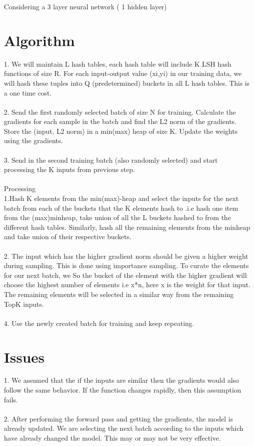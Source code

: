 \documentclass[letterpaper,10pt]{article}
\begin{document}
Considering a 3 layer neural network ( 1 hidden layer)
\section{Algorithm}
1. We will maintain L hash tables, each hash table will include K LSH hash functions of size R. For each input-output value (xi,yi) in our training data, we will hash these tuples into Q (predetermined) buckets in all L hash tables. This is a one time cost.\\
\\
2. Send the first randomly selected batch of size N for training. Calculate the gradients for each sample in the batch and find the L2 norm of the gradients. Store the (input, L2 norm) in a min(max) heap of size K. Update the weights using the gradients.\\
\\
3. Send in the second training batch (also randomly selected) and start processing the K inputs from previous step.
\\
\\
Processing\\
1.Hash K elements from the min(max)-heap and select the inputs for the next batch from each of the buckets that the K elements hash to .i.e hash one item from the (max)minheap, take union of all the L buckets hashed to from the different hash tables. Similarly, hash all the remaining elements from the minheap and take union of their respective buckets. \\
\\
2. The input which has the higher gradient norm should be given a higher weight during sampling. This is done using importance sampling. To curate the elements for our next batch, we  So the bucket of the element with the higher gradient will choose the highest number of elements i.e x*n, here x is the weight for that input. The remaining elements will be selected in a similar way from the remaining TopK inputs.
\\
\\
4. Use the newly created batch for training and keep repeating.


\section{Issues}
1. We assumed that the if the inputs are similar then the gradients would also follow the same behavior. If the function changes rapidly, then this assumption fails.\\
\\
2. After performing the forward pass and getting the gradients, the model is already updated. We are selecting the next batch according to the inputs which have already changed the model. This may or may not be very effective.
\end{document}
